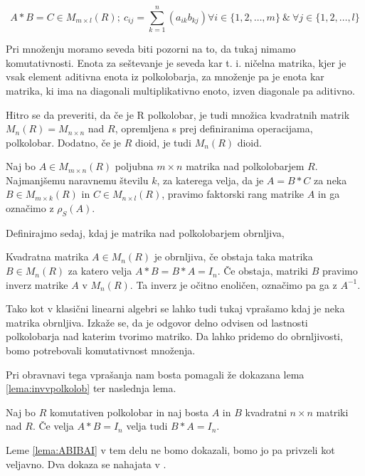 \documentclass[mat1]{fmfdelo}
\begin{document}
$$ 
	A*B = C \in M_{m\times l}(R);~ c_{ij} = \sum_{k = 1}^{n}(a_{ik}b_{kj}) \forall i \in \{1, 2, \ldots, m\}~\&~\forall j \in \{1, 2, \ldots, l\}
$$

Pri množenju moramo seveda biti pozorni na to, da tukaj nimamo komutativnosti. Enota za seštevanje je seveda kar t. i. ničelna matrika, kjer je vsak element aditivna enota iz polkolobarja, za množenje pa je enota kar matrika, ki ima na diagonali multiplikativno enoto, izven diagonale pa aditivno.

Hitro se da preveriti, da če je R polkolobar, je tudi množica kvadratnih matrik $M_n(R) = M_{n\times n}$ nad $R$, opremljena s prej definiranima operacijama, polkolobar. Dodatno, če je $R$ dioid, je tudi $M_n(R)$ dioid.

\begin{definicija}\label{def:faktorrang}
	Naj bo $A\in M_{m\times n}(R)$ poljubna $m\times n$ matrika nad polkolobarjem $R$. Najmanjšemu naravnemu številu $k$, za katerega velja, da je $A= B*C$ za neka $B\in M_{m\times k}(R)$ in $C\in M_{n\times l}(R)$, pravimo faktorski rang matrike $A$ in ga označimo z $\rho_S(A)$.
\end{definicija}

Definirajmo sedaj, kdaj je matrika nad polkolobarjem obrnljiva,

\begin{definicija}\label{def:invmatr}
	Kvadratna matrika $A\in M_n(R)$ je obrnljiva, če obstaja taka matrika $B\in M_n(R)$ za katero velja $A*B = B*A = I_n$. Če obstaja, matriki $B$ pravimo inverz matrike $A$ v $M_n(R)$. Ta inverz je očitno enoličen, označimo pa ga z $A^{-1}$.
\end{definicija}

Tako kot v klasični linearni algebri se lahko tudi tukaj vprašamo kdaj je neka matrika obrnljiva. Izkaže se, da je odgovor delno odvisen od lastnosti polkolobarja nad katerim tvorimo matriko. Da lahko pridemo do obrnljivosti, bomo potrebovali komutativnost množenja.

Pri obravnavi tega vprašanja nam bosta pomagali že dokazana lema \ref{lema:invvpolkolob} ter naslednja lema.

\begin{lema}\label{lema:ABIBAI}
	Naj bo $R$ komutativen polkolobar in naj bosta $A$ in $B$ kvadratni $n\times n$ matriki nad $R$. Če velja $A*B = I_n$ velja tudi $B*A=I_n$.
\end{lema}

Leme \ref{lema:ABIBAI} v tem delu ne bomo dokazali, bomo jo pa privzeli kot veljavno. Dva dokaza se nahajata v \cite{bib:Reutenauer}.
\end{document}
